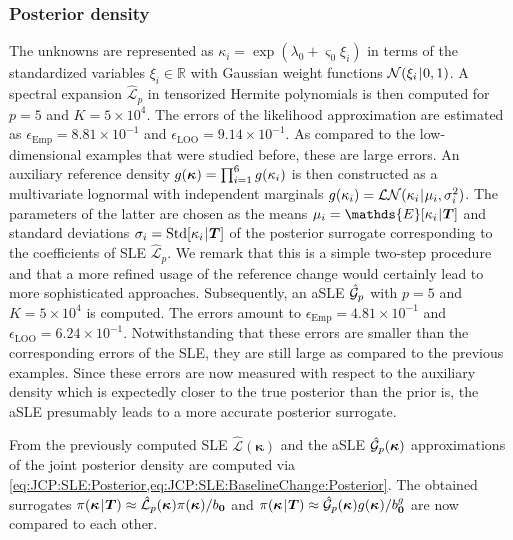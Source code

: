 \subsubsection{Posterior density}
The unknowns are represented as \(\kappa_i = \exp(\lambda_0 + \varsigma_0 \xi_i)\) in terms of the standardized variables
\(\xi_i \in \mathds{R}\) with Gaussian weight functions \(\mathcal{N}(\xi_i {\:\!}|{\:\!} 0,1)\).
A spectral expansion \(\hat{\mathcal{L}}_p\) in tensorized Hermite polynomials is then computed for \(p = 5\) and \(K = 5 \times 10^4\).
The errors of the likelihood approximation are estimated as \(\epsilon_{\mathrm{Emp}} = 8.81 \times 10^{-1}\) and \(\epsilon_{\mathrm{LOO}} = 9.14 \times 10^{-1}\).
As compared to the low-dimensional examples that were studied before, these are large errors.
An auxiliary reference density \(g(\bm{\kappa}) = \prod_{i=1}^6 g(\kappa_i)\) is then constructed as a
multivariate lognormal with independent marginals \(g(\kappa_i) = \mathcal{LN}(\kappa_i {\:\!}|{\:\!} \mu_i,\sigma_i^2)\).
The parameters of the latter are chosen as the means \(\mu_i = \mathds{E}[\kappa_i \cond \bm{T}]\) and standard deviations
\(\sigma_i = \mathrm{Std}[\kappa_i {\:\!}|{\:\!} \bm{T}]\) of the posterior surrogate corresponding to the coefficients of SLE \(\hat{\mathcal{L}}_p\).
We remark that this is a simple two-step procedure and that a more refined usage of the reference change would certainly lead to more sophisticated approaches.
Subsequently, an aSLE \(\hat{\mathcal{G}}_p\) with \(p = 5\) and  \(K = 5 \times 10^4\) is computed.
The errors amount to \(\epsilon_{\mathrm{Emp}} = 4.81 \times 10^{-1}\) and \(\epsilon_{\mathrm{LOO}} = 6.24 \times 10^{-1}\).
Notwithstanding that these errors are smaller than the corresponding errors of the SLE, they are still large as compared to the previous examples.
Since these errors are now measured with respect to the auxiliary density which is expectedly closer to the true posterior than the prior is,
the aSLE presumably leads to a more accurate posterior surrogate.
\par %
From the previously computed SLE \(\hat{\mathcal{L}}(\bm{\kappa})\) and the aSLE \(\hat{\mathcal{G}}_p(\bm{\kappa})\)
approximations of the joint posterior density are computed via \cref{eq:JCP:SLE:Posterior,eq:JCP:SLE:BaselineChange:Posterior}.
The obtained surrogates \(\pi(\bm{\kappa} {\:\!}|{\:\!} \bm{T}) \approx \hat{\mathcal{L}}_p(\bm{\kappa}) \pi(\bm{\kappa}) / b_{\bm{0}}\) and
\(\pi(\bm{\kappa} {\:\!}|{\:\!} \bm{T}) \approx \hat{\mathcal{G}}_p(\bm{\kappa}) g(\bm{\kappa}) / b^{g}_{\bm{0}}\) are now compared to each other.
